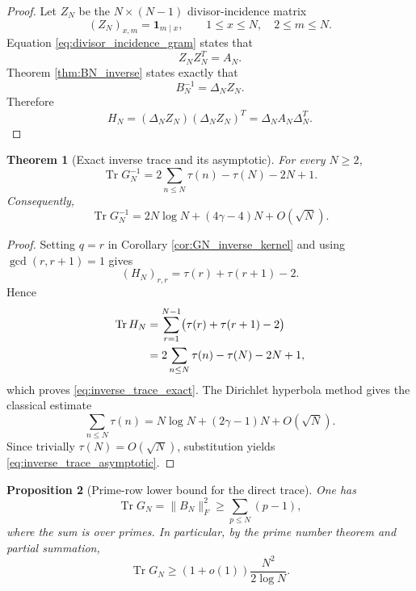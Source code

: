 \documentclass[11pt]{amsart}
\numberwithin{equation}{section}
\theoremstyle{plain}
\newtheorem{theorem}{Theorem}[section]
\newtheorem{proposition}[theorem]{Proposition}
\theoremstyle{definition}
\theoremstyle{remark}
\newcommand{\Tr}{\operatorname{Tr}}
\begin{document}
\begin{proof}
Let $Z_N$ be the $N\times(N-1)$ divisor-incidence matrix
\begin{equation}
(Z_N)_{x,m}=\mathbf 1_{m\mid x},
\qquad 1\le x\le N,\quad 2\le m\le N.
\end{equation}
Equation \eqref{eq:divisor_incidence_gram} states that
\begin{equation}
Z_NZ_N^T=A_N.
\end{equation}
Theorem \ref{thm:BN_inverse} states exactly that
\begin{equation}
B_N^{-1}=\Delta_NZ_N.
\end{equation}
Therefore
\begin{equation}
H_N=(\Delta_NZ_N)(\Delta_NZ_N)^T
=\Delta_NA_N\Delta_N^T.
\end{equation}
\end{proof}

\begin{theorem}[Exact inverse trace and its asymptotic]
\label{thm:inverse_trace}
For every $N\ge2$,
\begin{equation}
\Tr G_N^{-1}
=2\sum_{n\le N}\tau(n)-\tau(N)-2N+1.
\label{eq:inverse_trace_exact}
\end{equation}
Consequently,
\begin{equation}
\Tr G_N^{-1}
=2N\log N+(4\gamma-4)N+O(\sqrt N).
\label{eq:inverse_trace_asymptotic}
\end{equation}
\end{theorem}

\begin{proof}
Setting $q=r$ in Corollary \ref{cor:GN_inverse_kernel} and using $\gcd(r,r+1)=1$ gives
\begin{equation}
(H_N)_{r,r}=\tau(r)+\tau(r+1)-2.
\label{eq:H_diagonal}
\end{equation}
Hence
\begin{align}
\Tr H_N
&=\sum_{r=1}^{N-1}\bigl(\tau(r)+\tau(r+1)-2\bigr)\notag\\
&=2\sum_{n\le N}\tau(n)-\tau(N)-2N+1,
\end{align}
which proves \eqref{eq:inverse_trace_exact}.  The Dirichlet hyperbola method gives the classical estimate
\begin{equation}
\sum_{n\le N}\tau(n)
=N\log N+(2\gamma-1)N+O(\sqrt N).
\end{equation}
Since trivially $\tau(N)=O(\sqrt N)$, substitution yields \eqref{eq:inverse_trace_asymptotic}.
\end{proof}

\begin{proposition}[Prime-row lower bound for the direct trace]
\label{prop:trace_G_lower}
One has
\begin{equation}
\Tr G_N=\|B_N\|_F^2
\ge \sum_{p\le N}(p-1),
\label{eq:trace_G_prime_lower_exact}
\end{equation}
where the sum is over primes.  In particular, by the prime number theorem and partial summation,
\begin{equation}
\Tr G_N\ge (1+o(1))\frac{N^2}{2\log N}.
\label{eq:trace_G_prime_lower_asymptotic}
\end{equation}
\end{proposition}
\end{document}
